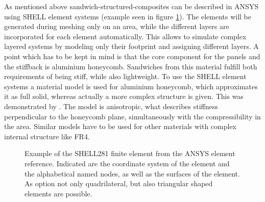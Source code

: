 \documentclass[
a4paper,                                %
twoside,                                %
BCOR1.4cm,                      %
10pt,                           %
headings=normal,                %
headsepline,                    %
clearplainpage, %
final,                                  %
div=14,
parskip=full,
openright,
bibliography=toc
]{scrreprt}
\begin{document}
As mentioned above sandwich-structured-composites can be described in ANSYS using SHELL element systems (example seen in figure \ref{finiteElement}). The elements will be generated during meshing only on an area, while the different layers are incorporated for each element automatically. This allows to simulate complex layered systems by modeling only their footprint and assigning different layers. A point which has to be kept in mind is that the core component for the panels and the stiffback is aluminium honeycomb. Sandwiches from this material fulfill both requirements of being stiff, while also lightweight. To use the SHELL element systems a material model is used for aluminium honeycomb, which approximates it as full solid, whereas actually a more complex structure is given. This was demonstrated by \cite{ponsotTalk}. The model is anisotropic, what describes stiffness perpendicular to the honeycomb plane, simultaneously with the compressibility in the area. Similar models have to be used for other materials with complex internal structure like FR4.

\captionsetup[figure]{format=plain, labelsep=newline}
\begin{figure}[H]
	\begin{minipage}[b]{0.45\linewidth}
		\centering
	\end{minipage}
	\hspace{0.5cm}
	\begin{minipage}[b]{0.45\linewidth}
		\caption{Example of the SHELL281 finite element from the ANSYS element reference.\cite{ansys} Indicated are the coordinate system of the element and the alphabetical named nodes, as well as the surfaces of the element. As option not only quadrilateral, but also triangular shaped elements are possible.}
		\label{finiteElement}
	\end{minipage}
\end{figure}
\captionsetup[figure]{format=hang, labelsep=colon}


\end{document}
